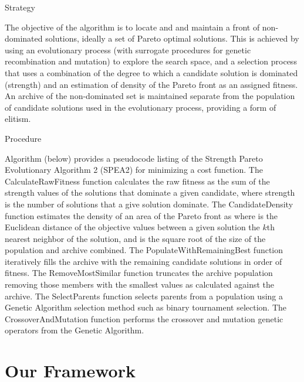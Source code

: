 \documentclass[12pt,oneside,draft]{fithesis2}
\begin{document}
Strategy

The objective of the algorithm is to locate and and maintain a front of non-dominated solutions, ideally a set of Pareto optimal solutions. This is achieved by using an evolutionary process (with surrogate procedures for genetic recombination and mutation) to explore the search space, and a selection process that uses a combination of the degree to which a candidate solution is dominated (strength) and an estimation of density of the Pareto front as an assigned fitness. An archive of the non-dominated set is maintained separate from the population of candidate solutions used in the evolutionary process, providing a form of elitism.

Procedure

Algorithm (below) provides a pseudocode listing of the Strength Pareto Evolutionary Algorithm 2 (SPEA2) for minimizing a cost function. The CalculateRawFitness function calculates the raw fitness as the sum of the strength values of the solutions that dominate a given candidate, where strength is the number of solutions that a give solution dominate. The CandidateDensity function estimates the density of an area of the Pareto front as  where  is the Euclidean distance of the objective values between a given solution the $k$th nearest neighbor of the solution, and  is the square root of the size of the population and archive combined. The PopulateWithRemainingBest function iteratively fills the archive with the remaining candidate solutions in order of fitness. The RemoveMostSimilar function truncates the archive population removing those members with the smallest  values as calculated against the archive. The SelectParents function selects parents from a population using a Genetic Algorithm selection method such as binary tournament selection. The CrossoverAndMutation function performs the crossover and mutation genetic operators from the Genetic Algorithm.

\chapter{Our Framework}






\end{document}
